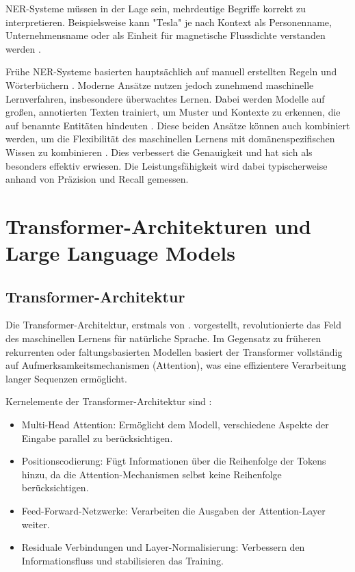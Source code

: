 \gls{NER}-Systeme müssen in der Lage sein, mehrdeutige Begriffe korrekt zu interpretieren. Beispielsweise kann "Tesla" je nach Kontext als Personenname, Unternehmensname oder als Einheit für magnetische Flussdichte verstanden werden \cite{RebalaGopinath2019AItM}.

Frühe \gls{NER}-Systeme basierten hauptsächlich auf manuell erstellten Regeln und Wörterbüchern \cite{nadeau2007survey}. Moderne Ansätze nutzen jedoch zunehmend maschinelle Lernverfahren, insbesondere überwachtes Lernen. Dabei werden Modelle auf großen, annotierten Texten trainiert, um Muster und Kontexte zu erkennen, die auf benannte Entitäten hindeuten \cite{nadeau2007survey}.
Diese beiden Ansätze können auch kombiniert werden, um die Flexibilität des maschinellen Lernens mit domänenspezifischen Wissen zu kombinieren \cite{nadeau2007survey}. Dies verbessert die Genauigkeit und hat sich als besonders effektiv erwiesen. Die Leistungsfähigkeit wird dabei typischerweise anhand von Präzision und Recall gemessen.

\section{Transformer-Architekturen und Large Language Models}
\label{sec:transformers-llms}

\subsection{Transformer-Architektur}
\label{subsec:transformer-architecture}

Die Transformer-Architektur, erstmals von \textcite{VaswaniAshish2023AIAY}. vorgestellt, revolutionierte das Feld des maschinellen Lernens für natürliche Sprache. Im Gegensatz zu früheren rekurrenten oder faltungsbasierten Modellen basiert der Transformer vollständig auf Aufmerksamkeitsmechanismen (Attention), was eine effizientere Verarbeitung langer Sequenzen ermöglicht.

Kernelemente der Transformer-Architektur sind \cite{VaswaniAshish2023AIAY}:
\begin{itemize}
	\item Multi-Head Attention: Ermöglicht dem Modell, verschiedene Aspekte der Eingabe parallel zu berücksichtigen.
	\item Positionscodierung: Fügt Informationen über die Reihenfolge der Tokens hinzu, da die Attention-Mechanismen selbst keine Reihenfolge berücksichtigen.
	\item Feed-Forward-Netzwerke: Verarbeiten die Ausgaben der Attention-Layer weiter.
	\item Residuale Verbindungen und Layer-Normalisierung: Verbessern den Informationsfluss und stabilisieren das Training.
\end{itemize}

